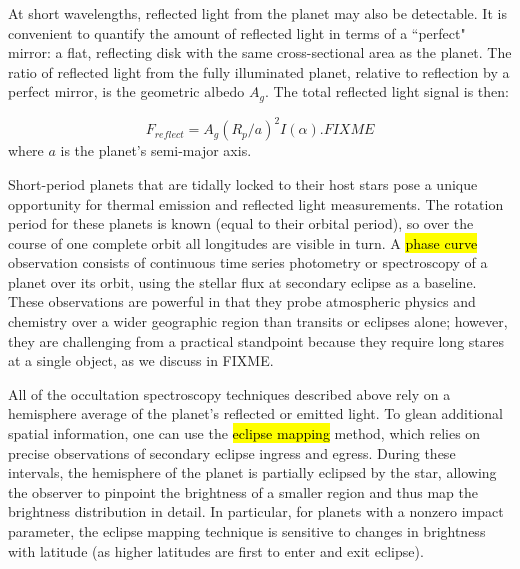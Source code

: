 \documentclass[graybox,natbib,nosecnum]{svmult}
\newcommand{\hbindex}[1]{\hl{#1}\index{#1}}  %
\begin{document}

At short wavelengths, reflected light from the planet may also be detectable. It is convenient to quantify the amount of reflected light in terms of a ``perfect" mirror: a flat, reflecting disk with the same cross-sectional area as the planet. The ratio of reflected light from the fully illuminated planet, relative to reflection by a perfect mirror, is the geometric albedo $A_g$. The total reflected light signal is then:

\begin{equation}
F_{reflect} = A_g(R_p/a)^2 I(\alpha). FIXME
\end{equation}
where $a$ is the planet's semi-major axis.

Short-period planets that are tidally locked to their host stars pose a unique opportunity for thermal emission and reflected light measurements. The rotation period for these planets is known (equal to their orbital period), so over the course of one complete orbit all longitudes are visible in turn. A \hbindex{phase curve} observation consists of continuous time series photometry or spectroscopy of a planet over its orbit, using the stellar flux at secondary eclipse as a baseline. These observations are powerful in that they probe atmospheric physics and chemistry over a wider geographic region than transits or eclipses alone; however, they are challenging from a practical standpoint because they require long stares at a single object, as we discuss in FIXME. %

All of the occultation spectroscopy techniques described above rely on a hemisphere average of the planet's reflected or emitted light. To glean additional spatial information, one can use the \hbindex{eclipse mapping} method, which relies on precise observations of secondary eclipse ingress and egress.  During these intervals, the hemisphere of the planet is partially eclipsed by the star, allowing the observer to pinpoint the brightness of a smaller region and thus map the brightness distribution in detail. In particular, for planets with a nonzero impact parameter, the eclipse mapping technique is sensitive to changes in brightness with latitude (as higher latitudes are first to enter and exit eclipse).
\end{document}
